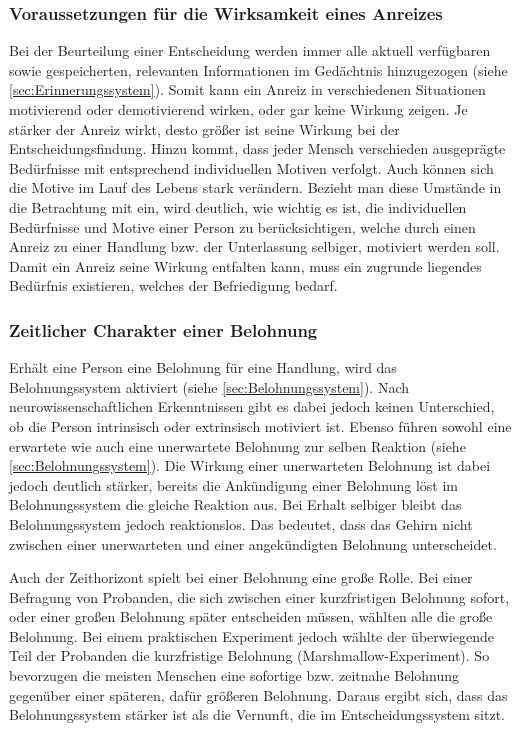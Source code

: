 \subsubsection{Voraussetzungen für die Wirksamkeit eines Anreizes}
Bei der Beurteilung einer Entscheidung werden immer alle aktuell verfügbaren sowie gespeicherten, relevanten Informationen im Gedächtnis hinzugezogen (siehe \ref{sec:Erinnerungssystem}). Somit kann ein Anreiz in verschiedenen Situationen motivierend oder demotivierend wirken, oder gar keine Wirkung zeigen. Je stärker der Anreiz wirkt, desto größer ist seine Wirkung bei der Entscheidungsfindung. Hinzu kommt, dass jeder Mensch verschieden ausgeprägte Bedürfnisse mit entsprechend individuellen Motiven verfolgt. Auch können sich die Motive im Lauf des Lebens stark verändern. \citep[S. 70]{Nowka.2013}
Bezieht man diese Umstände in die Betrachtung mit ein, wird deutlich, wie wichtig es ist, die individuellen Bedürfnisse und Motive einer Person zu berücksichtigen, welche durch einen Anreiz zu einer Handlung bzw. der Unterlassung selbiger, motiviert werden soll. Damit ein Anreiz seine Wirkung entfalten kann, muss ein zugrunde liegendes Bedürfnis existieren, welches der Befriedigung bedarf. \citep[S. 78]{Nowka.2013}

\subsubsection{Zeitlicher Charakter einer Belohnung}
Erhält eine Person eine Belohnung für eine Handlung, wird das Belohnungssystem aktiviert (siehe \ref{sec:Belohnungssystem}). Nach neurowissenschaftlichen Erkenntnissen gibt es dabei jedoch keinen Unterschied, ob die Person intrinsisch oder extrinsisch motiviert ist. \citep[S. 71]{Nowka.2013}
Ebenso führen sowohl eine erwartete wie auch eine unerwartete Belohnung zur selben Reaktion (siehe \ref{sec:Belohnungssystem}). Die Wirkung einer unerwarteten Belohnung ist dabei jedoch deutlich stärker,  bereits die Ankündigung einer Belohnung löst im Belohnungssystem die gleiche Reaktion aus. Bei Erhalt selbiger bleibt das Belohnungssystem jedoch reaktionslos. Das bedeutet, dass das Gehirn nicht zwischen einer unerwarteten und einer angekündigten Belohnung unterscheidet. \citep[S. 71f]{Nowka.2013}
 
Auch der Zeithorizont spielt bei einer Belohnung eine große Rolle. Bei einer Befragung von Probanden, die sich zwischen einer kurzfristigen Belohnung sofort, oder einer großen Belohnung später entscheiden müssen, wählten alle die große Belohnung. Bei einem praktischen Experiment jedoch wählte der überwiegende Teil der Probanden die kurzfristige Belohnung (Marshmallow-Experiment). So bevorzugen die meisten Menschen eine sofortige bzw. zeitnahe Belohnung gegenüber einer späteren, dafür größeren Belohnung. Daraus ergibt sich, dass das Belohnungssystem stärker ist als die Vernunft, die im Entscheidungssystem sitzt. \citep[S. 19]{Seelbach.2011}

